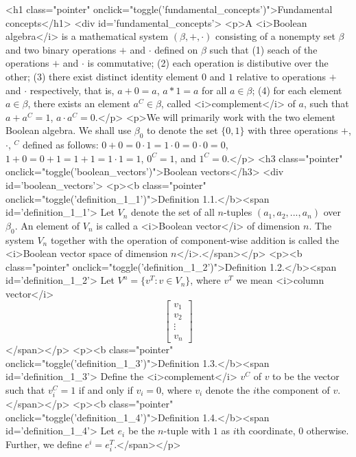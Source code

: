 {%

{%
    <h1 class="pointer" onclick="toggle('fundamental_concepts')">Fundamental concepts</h1>
    <div id='fundamental_concepts'>
        <p>A <i>Boolean algebra</i> is a mathematical system $(\beta, +, \cdot)$ consisting of a nonempty
        set $\beta$ and two binary operations $+$ and $\cdot$ defined on $\beta$ such that (1) seach of the operations $+$
        and $\cdot$ is commutative; (2) each operation is distibutive over the other; (3) there exist distinct identity
        element $0$ and $1$ relative to operations $+$ and $\cdot$ respectively, that is, $a+0=a$, $a*1=a$ for all
        $a\in\beta$; (4) for each element $a\in\beta$, there exists an element $a^C\in\beta$, called <i>complement</i> of
        $a$, such that $a+a^C=1$, $a\cdot a^C=0$.</p>
        <p>We will primarily work with the two element Boolean algebra. We shall use $\beta_0$ to denote the
        set $\{0,1\}$ with three operations $+$, $\cdot$, $^C$ defined as follows: $0+0=0\cdot 1=1 \cdot 0 = 0\cdot 0=0$,
        $1+ 0=0+1=1+1=1\cdot 1=1$, $0^C=1$, and $1^C=0$.</p>
        <h3 class="pointer" onclick="toggle('boolean_vectors')">Boolean vectors</h3>
        <div id='boolean_vectors'>
            <p><b class="pointer" onclick="toggle('definition_1_1')">Definition 1.1.</b><span id='definition_1_1'> Let $V_n$ denote the set of all $n$-tuples $(a_1, a_2, ..., a_n)$ over $\beta_0$. An element of $V_n$ is called a <i>Boolean vector</i> of dimension $n$. The system $V_n$ together with the operation of component-wise addition is called the <i>Boolean vector space of dimension $n$</i>.</span></p>
            <p><b class="pointer" onclick="toggle('definition_1_2')">Definition 1.2.</b><span id='definition_1_2'> Let $V^n=\{v^T: v \in V_n\}$, where $v^T$ we mean <i>column vector</i> $$\begin{bmatrix}v_1\\v_2\\\vdots\\v_n\end{bmatrix}$$</span></p>
            <p><b class="pointer" onclick="toggle('definition_1_3')">Definition 1.3.</b><span id='definition_1_3'> Define the <i>complement</i> $v^C$ of $v$ to be the vector such that $v_i^C=1$ if and only if $v_i=0$, where $v_i$ denote the $i$the component of $v$.</span></p>
            <p><b class="pointer" onclick="toggle('definition_1_4')">Definition 1.4.</b><span id='definition_1_4'> Let $e_i$ be the $n$-tuple with $1$ as $i$th coordinate, $0$ otherwise. Further, we define $e^i=e_i^T$.</span></p>
}}
